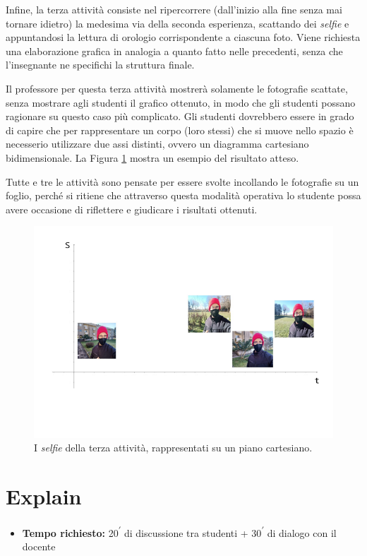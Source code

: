 \documentclass{report} \usepackage[T1]{fontenc} \usepackage[italian]{babel}
\begin{document}
Infine, la terza attività consiste nel ripercorrere (dall'inizio alla fine
senza mai tornare idietro) la medesima via della
seconda esperienza, scattando dei \emph{selfie} e appuntandosi la lettura di orologio
corrispondente a ciascuna foto. Viene richiesta una elaborazione grafica in
analogia a quanto fatto nelle precedenti, senza che l’insegnante ne specifichi
la struttura finale.

Il professore per questa terza attività mostrerà solamente le fotografie
scattate, senza mostrare agli studenti il grafico ottenuto, in modo che gli
studenti possano ragionare su questo caso più complicato.
Gli studenti dovrebbero essere in grado di capire che per rappresentare
un corpo (loro stessi) che si muove nello spazio è necesserio utilizzare
due assi distinti, ovvero un diagramma cartesiano bidimensionale.
La Figura \ref{fig:piano_s_t} mostra un esempio del risultato atteso.

Tutte e tre le attività sono pensate per essere svolte incollando le fotografie
su un foglio, perché si ritiene che attraverso questa modalità operativa lo
studente  possa avere occasione di riflettere e giudicare i risultati ottenuti.

\begin{figure}[ht]
\centering
  \includegraphics[width=\textwidth]{piano_s_t}
  \caption{I \emph{selfie} della terza attività, rappresentati
           su un piano cartesiano.}
  \label{fig:piano_s_t}
\end{figure}

\section{Explain}\label{posizioni_istanti_explain}
\begin{itemize}
\item \textbf{Tempo richiesto:} 20\textsuperscript{$\prime$} di discussione tra
studenti + 30\textsuperscript{$\prime$} di dialogo con il docente
\end{itemize}
\end{document}
